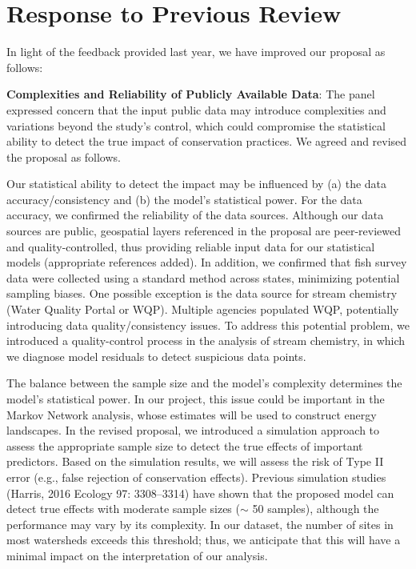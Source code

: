 \documentclass[12pt, class=article, crop=false]{standalone}
\begin{document}
\section*{Response to Previous Review}

In light of the feedback provided last year, we have improved our proposal as follows:

\textbf{Complexities and Reliability of Publicly Available Data}:
The panel expressed concern that the input public data may introduce complexities and variations beyond the study's control, which could compromise the statistical ability to detect the true impact of conservation practices.
We agreed and revised the proposal as follows.

Our statistical ability to detect the impact may be influenced by (a) the data accuracy/consistency and (b) the model's statistical power.
For the data accuracy, we confirmed the reliability of the data sources.
Although our data sources are public, geospatial layers referenced in the proposal are peer-reviewed and quality-controlled, thus providing reliable input data for our statistical models (appropriate references added).
In addition, we confirmed that fish survey data were collected using a standard method across states, minimizing potential sampling biases.
One possible exception is the data source for stream chemistry (Water Quality Portal or WQP).
Multiple agencies populated WQP, potentially introducing data quality/consistency issues.
To address this potential problem, we introduced a quality-control process in the analysis of stream chemistry, in which we diagnose model residuals to detect suspicious data points.

The balance between the sample size and the model's complexity determines the model's statistical power.
In our project, this issue could be important in the Markov Network analysis, whose estimates will be used to construct energy landscapes.
In the revised proposal, we introduced a simulation approach to assess the appropriate sample size to detect the true effects of important predictors.
Based on the simulation results, we will assess the risk of Type II error (e.g., false rejection of conservation effects).
Previous simulation studies (Harris, 2016 Ecology 97: 3308--3314) have shown that the proposed model can detect true effects with moderate sample sizes ($\sim$ 50 samples), although the performance may vary by its complexity.
In our dataset, the number of sites in most watersheds exceeds this threshold; thus, we anticipate that this will have a minimal impact on the interpretation of our analysis.
\end{document}
